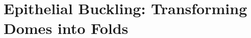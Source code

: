 \documentclass[11pt, final, a4paper, twoside, openright]{book}
\begin{document}
%	
%
	\renewcommand{\thesection}{8.\arabic{section}}
	\hypertarget{epithelial-buckling-transforming-domes-into-folds}{%
	\chapter{Epithelial Buckling: Transforming Domes into Folds}\label{epithelial-buckling-transforming-domes-into-folds}}
	
%	
%	
%	
%
%
%		
%
%		
	
	\backmatter
	
	
\end{document}

